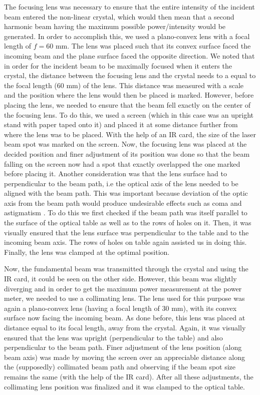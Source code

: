 The focusing lens was necessary to ensure that the entire intensity of the incident beam entered the non-linear crystal, which would then mean that a second harmonic beam having the maximum possible power/intensity would be generated. In order to accomplish this, we used a plano-convex lens with a focal length of $f=$60 mm. The lens was placed such that its convex surface faced the incoming beam and the plane surface faced the opposite direction. We noted that in order for the incident beam to be maximally focused when it enters the crystal, the distance between the focusing lens and the crystal needs to a  equal to the focal length (60 mm) of the lens. This distance was measured with a scale and the position where the lens would then be placed is marked. However, before placing the lens, we needed to ensure that the beam fell exactly on the center of the focusing lens. To do this, we used a screen (which in this case was an upright stand with paper taped onto it) and placed it at some distance further from where the lens was to be placed. With the help of an IR card, the size of the laser beam spot was marked on the screen. Now, the focusing lens was placed at the decided position and finer adjustment of its position was done so that the beam falling on the screen now had a spot that exactly overlapped the one marked before placing it. Another consideration was that the lens surface had to perpendicular to the beam path, i.e the optical axis of the lens needed to be aligned with the beam path. This was important because deviation of the optic axis from the beam path would produce undesirable effects such as coma and astigmatism \cite{UB}. To do this we first checked if the beam path was itself parallel to the surface of the optical table as well as to the rows of holes on it. Then, it was visually ensured that the lens surface was perpendicular to the table and to the incoming beam axis. The rows of holes on table again assisted us in doing this. Finally, the lens was clamped at the optimal position.   

Now, the fundamental beam was transmitted through the crystal and using the IR card, it could be seen on the other side. However, this beam was slightly diverging and in order to get the maximum power measurement at the power meter, we needed to use a collimating lens. The lens used for this purpose was again a plano-convex lens (having a focal length of 30 mm), with its convex surface now facing the incoming beam. As done before, this lens was placed at distance equal to its focal length, away from the crystal. Again, it was visually ensured that the lens was upright (perpendicular to the table) and also perpendicular to the beam path. Finer adjustment of the lens position (along beam axis) was made by moving the screen over an appreciable distance along the (supposedly) collimated beam path and observing if the beam spot size remains the same (with the help of the IR card). After all these adjustments, the collimating lens position was finalized and it was clamped to the optical table.

